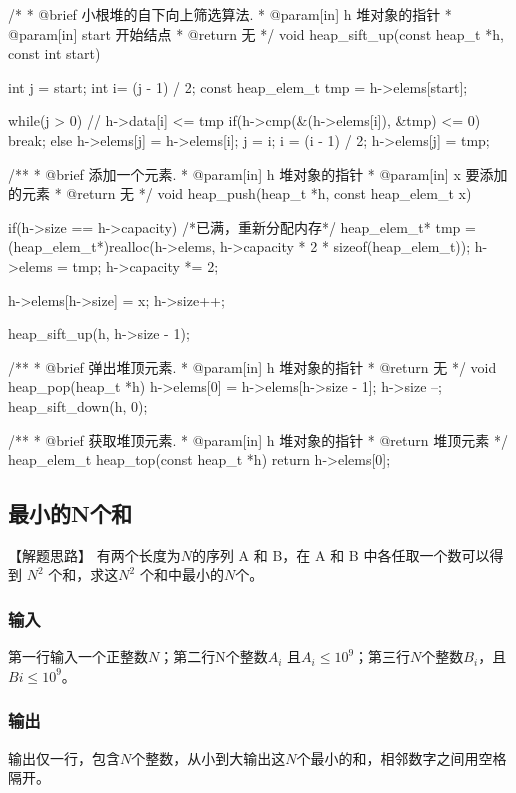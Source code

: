 \begin{Codex}[label=heap.c]
/*
 * @brief 小根堆的自下向上筛选算法.
 * @param[in] h 堆对象的指针
 * @param[in] start 开始结点
 * @return 无
 */
void heap_sift_up(const heap_t *h, const int start) {
    int j = start;
    int i= (j - 1) / 2;
    const heap_elem_t tmp = h->elems[start];

    while(j > 0) {
        // h->data[i] <= tmp
        if(h->cmp(&(h->elems[i]), &tmp) <= 0) {
            break;
        } else {
            h->elems[j] = h->elems[i];
            j = i;
            i = (i - 1) / 2;
        }
    }
    h->elems[j] = tmp;
}

/**
 * @brief 添加一个元素.
 * @param[in] h 堆对象的指针
 * @param[in] x 要添加的元素
 * @return 无
 */
void heap_push(heap_t *h, const heap_elem_t x) {
    if(h->size == h->capacity) { /*已满，重新分配内存*/
        heap_elem_t* tmp =
            (heap_elem_t*)realloc(h->elems, h->capacity * 2 * sizeof(heap_elem_t));
        h->elems = tmp;
        h->capacity *= 2;
    }

    h->elems[h->size] = x;
    h->size++;

    heap_sift_up(h, h->size - 1);
}

/**
 * @brief 弹出堆顶元素.
 * @param[in] h 堆对象的指针
 * @return 无
 */
void heap_pop(heap_t *h) {
    h->elems[0] = h->elems[h->size - 1];
    h->size --;
    heap_sift_down(h, 0);
}

/**
 * @brief 获取堆顶元素.
 * @param[in] h 堆对象的指针
 * @return 堆顶元素
 */
heap_elem_t heap_top(const heap_t *h) {
    return h->elems[0];
}
\end{Codex}


\subsection{最小的N个和} %
【解题思路】
有两个长度为$N$的序列 A 和 B，在 A 和 B 中各任取一个数可以得到 $N^2$ 个和，求这$N^2$ 个和中最小的$N$个。

\subsubsection{输入}
第一行输入一个正整数$N$；第二行N个整数$A_i$ 且$A_i \leq 10^9$；第三行$N$个整数$B_i$，且$Bi \leq 10^9$。

\subsubsection{输出}
输出仅一行，包含$N$个整数，从小到大输出这$N$个最小的和，相邻数字之间用空格隔开。


